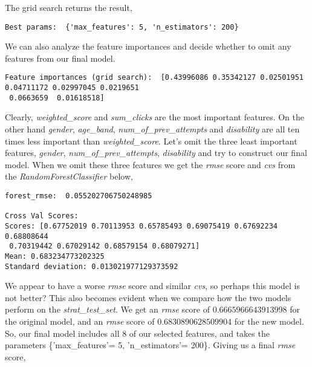 \documentclass[8pt]{article}
\begin{document}
\newline
\newline
The grid search returns the result,
\newline
\newline
\begin{adjustbox}{max width=\textwidth}
\begin{lstlisting}
Best params:  {'max_features': 5, 'n_estimators': 200}
\end{lstlisting}
\end{adjustbox}
\newline
\newline
We can also analyze the feature importances and decide whether to omit any features from our final model.
\newline
\newline
\begin{adjustbox}{max width=\textwidth}
\begin{lstlisting}
Feature importances (grid search):  [0.43996086 0.35342127 0.02501951 0.04711172 0.02997045 0.0219651
 0.0663659  0.01618518]
\end{lstlisting}
\end{adjustbox}
\newline
\newline
Clearly, \textit{weighted\_score} and \textit{sum\_clicks} are the most important features. On the other hand \textit{gender}, \textit{age\_band}, \textit{num\_of\_prev\_attempts} and \textit{disability} are all ten times less important than \textit{weighted\_score}. Let's omit the three least important features, \textit{gender}, \textit{num\_of\_prev\_attempts}, \textit{disability} and try to construct our final model. When we omit these three features we get the \textit{rmse} score and \textit{cvs} from the \textit{RandomForestClassifier} below,
\newline
\newline
\begin{adjustbox}{max width=\textwidth}
\begin{lstlisting}
forest_rmse:  0.055202706750248985

Cross Val Scores:
Scores: [0.67752019 0.70113953 0.65785493 0.69075419 0.67692234 0.68808644
 0.70319442 0.67029142 0.68579154 0.68079271]
Mean: 0.683234773202325
Standard deviation: 0.013021977129373592
\end{lstlisting}
\end{adjustbox}
\newline
\newline
We appear to have a worse \textit{rmse} score and similar \textit{cvs}, so perhaps this model is not better? This also becomes evident when we compare how the two models perform on the \textit{strat\_test\_set}. We get an \textit{rmse} score of $0.6665966643913998$ for the original model, and an \textit{rmse} score of $0.6830890628509904$ for the new model. So, our final model includes all 8 of our selected features, and takes the parameters \{'max\_features'= 5, 'n\_estimators'= 200\}. Giving us a final \textit{rmse} score,
\end{document}
